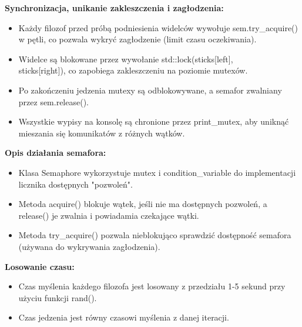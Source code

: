 \documentclass[a4paper,12pt]{article}
\begin{document}
        	\newpage
        	\vspace*{4em}
            \hspace{-1.5em}\textbf{Synchronizacja, unikanie zakleszczenia i zagłodzenia:}
            \begin{itemize}
                \item Każdy filozof przed próbą podniesienia widelców wywołuje sem.try\_acquire() w pętli, co pozwala wykryć zagłodzenie (limit czasu oczekiwania).
                \item Widelce są blokowane przez wywołanie std::lock(sticks[left],\\sticks[right]), co zapobiega zakleszczeniu na poziomie mutexów.
                \item Po zakończeniu jedzenia mutexy są odblokowywane, a semafor zwalniany przez sem.release().
                \item Wszystkie wypisy na konsolę są chronione przez print\_mutex, aby uniknąć mieszania się komunikatów z różnych wątków.
            \end{itemize}
            \vspace{1.5em}
        	\textbf{Opis działania semafora:}
            \begin{itemize}
                \item Klasa Semaphore wykorzystuje mutex i condition\_variable do implementacji licznika dostępnych "pozwoleń".
                \item Metoda acquire() blokuje wątek, jeśli nie ma dostępnych pozwoleń, a\\release() je zwalnia i powiadamia czekające wątki.
                \item Metoda try\_acquire() pozwala nieblokująco sprawdzić dostępność semafora (używana do wykrywania zagłodzenia).
            \end{itemize}
            \vspace{1.5em}
        	\textbf{Losowanie czasu:}
            \begin{itemize}
                \item Czas myślenia każdego filozofa jest losowany z przedziału 1-5 sekund przy użyciu funkcji rand().
                \item Czas jedzenia jest równy czasowi myślenia z danej iteracji.
            \end{itemize}
        \newpage
        \vspace*{2em}
\end{document}
